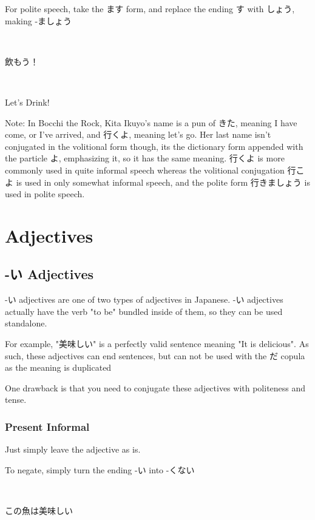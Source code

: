 \documentclass{article}
\begin{document}
\begin{CJK}{UTF8}{min}
For polite speech, take the ます form, and replace the ending す with しょう, making -ましょう

\begin{example}
\ 

飲もう！
\end{example}

\begin{solution}
\ 

Let's Drink!    
\end{solution}

Note: In Bocchi the Rock, Kita Ikuyo's name is a pun of きた, meaning I have come, or I've arrived, and 行くよ, meaning let's go. Her last name isn't conjugated in the volitional form though, its the dictionary form appended with the particle よ, emphasizing it, so it has the same meaning. 行くよ is more commonly used in quite informal speech whereas the volitional conjugation 行こよ is used in only somewhat informal speech, and the polite form 行きましょう is used in polite speech. 

\section{Adjectives}

\subsection{-い Adjectives}

-い adjectives are one of two types of adjectives in Japanese. -い adjectives actually have the verb "to be" bundled inside of them, so they can be used standalone.

For example, "美味しい" is a perfectly valid sentence meaning "It is delicious". As such, these adjectives can end sentences, but can not be used with the だ copula as the meaning is duplicated

One drawback is that you need to conjugate these adjectives with politeness and tense.

\subsubsection{Present Informal}

Just simply leave the adjective as is.

To negate, simply turn the ending -い into -くない
\begin{example}
\ 

この魚は美味しい


\end{example}
\end{CJK}
\end{document}
